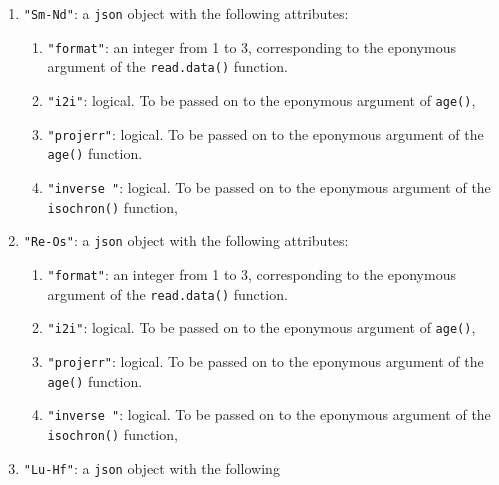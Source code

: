 \begin{refsection}
\begin{enumerate}[leftmargin=\parindent,align=left,
      labelwidth=\parindent,label*=2.\arabic*.]
\begin{enumerate}[leftmargin=\parindent,align=left,labelwidth=\parindent,label*=\arabic*.]
  \item{\tt "format"}: an integer from 1 to 3, corresponding to the
    eponymous argument of the \texttt{read.data()} function.
  \item{\tt "i2i"}: logical. To be passed on to the eponymous argument
    of \texttt{age()},
  \item{\tt "projerr"}: logical. To be passed on to the eponymous
    argument of the \texttt{age()} function.
  \item{\tt "inverse "}: logical. To be passed on to the eponymous
    argument of the \texttt{isochron()} function,
  \end{enumerate}
\item{\tt "Sm-Nd"}: a \texttt{json} object with the following
  attributes:
  \begin{enumerate}[leftmargin=\parindent,align=left,labelwidth=\parindent,label*=\arabic*.]
  \item{\tt "format"}: an integer from 1 to 3, corresponding to the
    eponymous argument of the \texttt{read.data()} function.
  \item{\tt "i2i"}: logical. To be passed on to the eponymous argument
    of \texttt{age()},
  \item{\tt "projerr"}: logical. To be passed on to the eponymous
    argument of the \texttt{age()} function.
  \item{\tt "inverse "}: logical. To be passed on to the eponymous
    argument of the \texttt{isochron()} function,
  \end{enumerate}
\item{\tt "Re-Os"}: a \texttt{json} object with the following
  attributes:
  \begin{enumerate}[leftmargin=\parindent,align=left,labelwidth=\parindent,label*=\arabic*.]
  \item{\tt "format"}: an integer from 1 to 3, corresponding to the
    eponymous argument of the \texttt{read.data()} function.
  \item{\tt "i2i"}: logical. To be passed on to the eponymous argument
    of \texttt{age()},
  \item{\tt "projerr"}: logical. To be passed on to the eponymous
    argument of the \texttt{age()} function.
  \item{\tt "inverse "}: logical. To be passed on to the eponymous
    argument of the \texttt{isochron()} function,
  \end{enumerate}
\item{\tt "Lu-Hf"}: a \texttt{json} object with the following

\end{enumerate}
\end{refsection}
